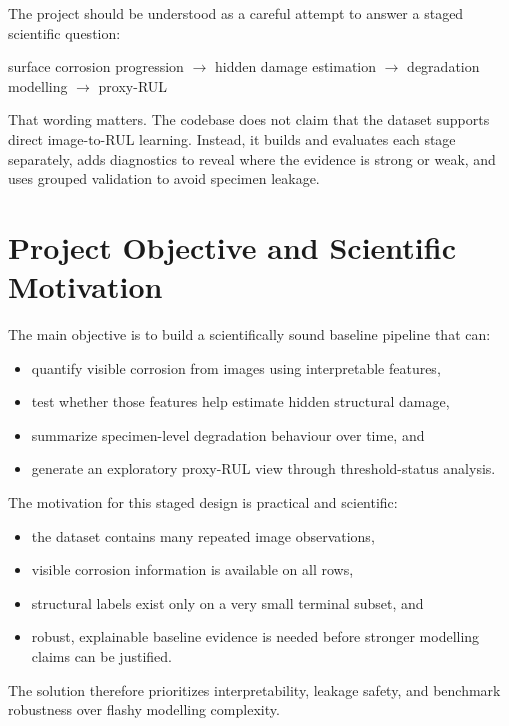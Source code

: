 \documentclass[10pt,a4paper,twocolumn]{article}
\begin{document}
The project should be understood as a careful attempt to answer a staged scientific question:

\begin{center}
surface corrosion progression $\rightarrow$ hidden damage estimation $\rightarrow$ degradation modelling $\rightarrow$ proxy-RUL
\end{center}

That wording matters. The codebase does not claim that the dataset supports direct image-to-RUL learning. Instead, it builds and evaluates each stage separately, adds diagnostics to reveal where the evidence is strong or weak, and uses grouped validation to avoid specimen leakage.

\section{Project Objective and Scientific Motivation}

The main objective is to build a scientifically sound baseline pipeline that can:

\begin{itemize}
    \item quantify visible corrosion from images using interpretable features,
    \item test whether those features help estimate hidden structural damage,
    \item summarize specimen-level degradation behaviour over time, and
    \item generate an exploratory proxy-RUL view through threshold-status analysis.
\end{itemize}

The motivation for this staged design is practical and scientific:

\begin{itemize}
    \item the dataset contains many repeated image observations,
    \item visible corrosion information is available on all rows,
    \item structural labels exist only on a very small terminal subset, and
    \item robust, explainable baseline evidence is needed before stronger modelling claims can be justified.
\end{itemize}

The solution therefore prioritizes interpretability, leakage safety, and benchmark robustness over flashy modelling complexity.
\end{document}

